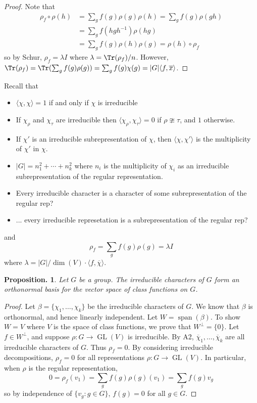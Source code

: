 \documentclass[11pt, a4paper]{memoir}
\theoremstyle{change}
\newtheorem{proposition}[theorem]{Proposition.}
\theoremstyle{plain}
\theoremstyle{nonumberplain}
\newtheorem{proof}{Proof}
\DeclareMathOperator{\GL}{GL}
\DeclareMathOperator{\spn}{span}
\numberwithin{equation}{section}
\begin{document}
\begin{proof}
    Note that
    \begin{align*}
        \rho_f\circ\rho(h)&=\sum_g f(g)\rho(g)\rho(h)=\sum_g f(g)\rho(gh)\\
                          &= \sum_g f(hgh^{-1})\rho(hg)\\
                          &= \sum_g f(g)\rho(h)\rho(g)=\rho(h)\circ\rho_f
    \end{align*}
    so by Schur, $\rho_f=\lambda I$ where $\lambda=\Tr(\rho_f)/n$.
    However, $\Tr(\rho_f)=\Tr(\sum_gf(g)\rho(g))=\sum_g f(g)\chi(g)=|G|\langle f,\overline{x}\rangle$.
\end{proof}
Recall that
\begin{itemize}[nl]
    \item $\langle\chi,\chi\rangle=1$ if and only if $\chi$ is irreducible
    \item If $\chi_\rho$ and $\chi_\tau$ are irreducible then $\langle\chi_\rho,\chi_\tau\rangle=0$ if $\rho\ncong\tau$, and $1$ otherwise.
    \item If $\chi'$ is an irreducible subrepresentation of $\chi$, then $\langle\chi,\chi'\rangle$ is the multiplicity of $\chi'$ in $\chi$.
    \item $|G|=n_1^2+\cdots+n_k^2$ where $n_i$ is the multiplicity of $\chi_i$ as an irreducible subrepresentation of the regular representation.
    \item Every irreducible character is a character of some subrepresentation of the regular rep?
    \item ... every irreducible represetation is a subrepresentation of the regular rep?
\end{itemize}
and
\begin{equation*}
    \rho_f=\sum_g f(g)\rho(g)=\lambda I
\end{equation*}
where $\lambda=|G|/\dim(V)\cdot\langle f,\overline{\chi}\rangle$.
\begin{proposition}
    Let $G$ be a group.
    The irreducible characters of $G$ form an orthonormal basis for the vector space of class functions on $G$.
\end{proposition}
\begin{proof}
    Let $\beta=\{\chi_1,\ldots,\chi_k\}$ be the irreducible characters of $G$.
    We know that $\beta$ is orthonormal, and hence linearly independent.
    Let $W=\spn(\beta)$.
    To show $W=V$ where $V$ is the space of class functions, we prove that $W^{\perp}=\{0\}$.
    Let $f\in W^\perp$, and suppose $\rho:G\to\GL(V)$ is irreducible.
    By A2, $\overline{\chi}_1,\ldots,\overline{\chi}_k$ are all irreducible characters of $G$.
    Thus $\rho_f=0$.
    By considering irreducible decompositions, $\rho_f=0$ for all representations $\rho:G\to\GL(V)$.
    In particular, when $\rho$ is the regular representation,
    \begin{equation*}
        0=\rho_f(v_1)=\sum_gf(g)\rho(g)(v_1)=\sum_g f(g)v_g
    \end{equation*}
    so by independence of $\{v_g:g\in G\}$, $f(g)=0$ for all $g\in G$.
\end{proof}
\end{document}
